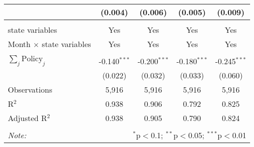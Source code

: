 \begin{tabular}{@{\extracolsep{1pt}}lcccc}
  & (0.004) & (0.006) & (0.005) & (0.009) \\ 
 \hline \\[-1.8ex] 
state variables & Yes & Yes & Yes & Yes \\ 
Month $\times$ state variables & Yes & Yes & Yes & Yes \\ 
\hline \\[-1.8ex] 
$\sum_j \mathrm{Policy}_j$ & -0.140$^{***}$ & -0.200$^{***}$ & -0.180$^{***}$ & -0.245$^{***}$ \\ 
 & (0.022) & (0.032) & (0.033) & (0.060) \\ 
Observations & 5,916 & 5,916 & 5,916 & 5,916 \\ 
R$^{2}$ & 0.938 & 0.906 & 0.792 & 0.825 \\ 
Adjusted R$^{2}$ & 0.938 & 0.905 & 0.790 & 0.824 \\ 
\hline 
\hline \\[-1.8ex] 
\textit{Note:}  & \multicolumn{4}{r}{$^{*}$p$<$0.1; $^{**}$p$<$0.05; $^{***}$p$<$0.01} \\ 
\end{tabular} 